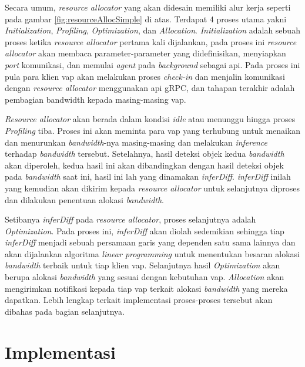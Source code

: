         Secara umum, \textit{resource allocator} yang akan didesain memiliki alur kerja seperti pada gambar \ref{fig:resourceAllocSimple} di atas. 
        Terdapat 4 proses utama yakni \textit{Initialization}, \textit{Profiling}, \textit{Optimization}, dan \textit{Allocation}.
        \textit{Initialization} adalah sebuah proses ketika \textit{resource allocator} pertama kali dijalankan, pada proses ini \textit{resource allocator} akan membaca parameter-parameter yang didefinisikan, menyiapkan \textit{port} komunikasi, dan memulai \textit{agent} pada \textit{background} sebagai \gls{api}.
        Pada proses ini pula para klien \gls{vap} akan melakukan proses \textit{check-in} dan menjalin komunikasi dengan \textit{resource allocator} menggunakan \gls{api} gRPC, dan tahapan terakhir adalah pembagian bandwidth kepada masing-masing \gls{vap}.

        \textit{Resource allocator} akan berada dalam kondisi \textit{idle} atau menunggu hingga proses \textit{Profiling} tiba. Proses ini akan meminta para \gls{vap} yang terhubung untuk menaikan dan menurunkan \textit{bandwidth}-nya masing-masing dan melakukan \textit{inference} terhadap \textit{bandwidth} tersebut.
        Setelahnya, hasil deteksi objek kedua \textit{bandwidth} akan diperoleh, kedua hasil ini akan dibandingkan dengan hasil deteksi objek pada \textit{bandwidth} saat ini, hasil ini lah yang dinamakan \textit{inferDiff}. \textit{inferDiff} inilah yang kemudian akan dikirim kepada \textit{resource allocator}
        untuk selanjutnya diproses dan dilakukan penentuan alokasi \textit{bandwidth}.

        Setibanya \textit{inferDiff} pada \textit{resource allocator}, proses selanjutnya adalah \textit{Optimization}. Pada proses ini, \textit{inferDiff} akan diolah sedemikian sehingga tiap \textit{inferDiff} menjadi sebuah persamaan garis yang dependen satu sama lainnya
        dan akan dijalankan algoritma \textit{linear programming} untuk menentukan besaran alokasi \textit{bandwidth} terbaik untuk tiap klien \gls{vap}.
        Selanjutnya hasil \textit{Optimization} akan berupa alokasi \textit{bandwidth} yang sesuai dengan kebutuhan \gls{vap}. \textit{Allocation} akan mengirimkan notifikasi kepada tiap \gls{vap} terkait alokasi \textit{bandwidth} yang mereka dapatkan.
        Lebih lengkap terkait implementasi proses-proses tersebut akan dibahas pada bagian selanjutnya.

\section{Implementasi}
